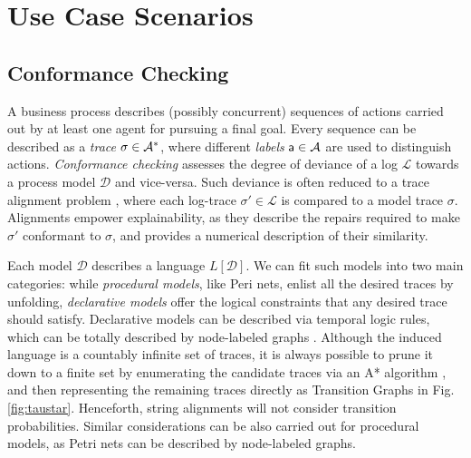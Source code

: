\section{Use Case Scenarios}
\subsection{Conformance Checking}
A business process describes (possibly concurrent) sequences of actions carried out by at least one agent for pursuing a final goal. Every sequence can be described as a \textit{trace} $\sigma\in\mathcal{A}^*$, where different \textit{labels} $\mathsf{a}\in\mathcal{A}$ are used to distinguish actions.
\textit{Conformance checking} assesses the degree of deviance of a log $\mathcal{L}$ towards a process model $\mathcal{D}$ and vice-versa. Such deviance is often reduced to a trace alignment problem \cite{DBLP:conf/edoc/AdriansyahDA11}, where each log-trace $\sigma'\in\mathcal{L}$ is compared to a model trace $\sigma$. Alignments empower explainability, as they describe the repairs required to make $\sigma'$ conformant to $\sigma$, and provides a numerical description of their similarity.

Each model $\mathcal{D}$ describes a language $L[\mathcal{D}]$. We can fit such models into two main categories: while \textit{procedural models}, like Peri nets, enlist all the desired traces by unfolding, \textit{declarative models} offer the logical constraints that any desired trace should satisfy. Declarative models can be described via temporal logic rules, which can be totally described by node-labeled graphs \cite{GiacomoMM14}. Although the induced language is a countably infinite set of traces, it is always possible to prune it down to a finite set  by enumerating the candidate traces via an A* algorithm \cite{LeoniMA12}, and then representing the remaining traces directly as Transition Graphs in Fig. \ref{fig:taustar}. Henceforth, string alignments will not consider transition probabilities. Similar considerations can be also carried out for procedural models, as Petri nets can be described by node-labeled graphs. %



